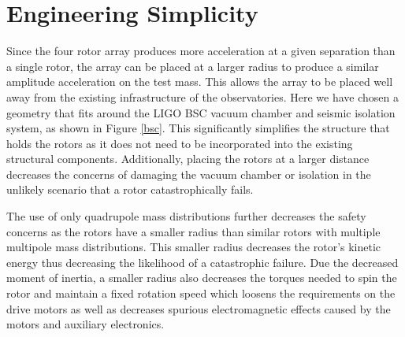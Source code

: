 \documentclass[superscriptaddress, twocolumn, prd]{revtex4-1}
\begin{document}
\section{Engineering Simplicity}

Since the four rotor array produces more acceleration at a given separation than a single rotor, the array can be placed at a larger radius to produce a similar amplitude acceleration on the test mass. This allows the array to be placed well away from the existing infrastructure of the observatories. Here we have chosen a geometry that fits around the LIGO BSC vacuum chamber and seismic isolation system, as shown in Figure \ref{bsc}. This significantly simplifies the structure that holds the rotors as it does not need to be incorporated into the existing structural components. Additionally, placing the rotors at a larger distance decreases the concerns of damaging the vacuum chamber or isolation in the unlikely scenario that a rotor catastrophically fails.

The use of only quadrupole mass distributions further decreases the safety concerns as the rotors have a smaller radius than similar rotors with multiple multipole mass distributions. This smaller radius decreases the rotor's kinetic energy thus decreasing the likelihood of a catastrophic failure. Due the decreased moment of inertia, a smaller radius also decreases the torques needed to spin the rotor and maintain a fixed rotation speed which loosens the requirements on the drive motors as well as decreases spurious electromagnetic effects caused by the motors and auxiliary electronics. 
\end{document}
